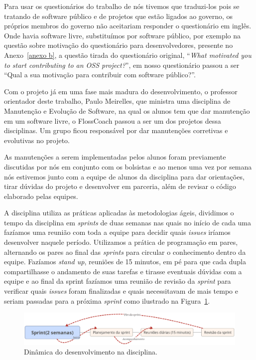 Para usar os questionários do trabalho de  nós tivemos que traduzi-los pois se tratando de
software público e de projetos que estão ligados ao governo, os próprios membros 
do governo não aceitariam responder o questionário em inglês. Onde havia software 
livre, substituímos por software público, por exemplo na questão sobre motivação
do questionário para desenvolvedores, presente no Anexo~\ref{anexo b}, a questão 
tirada do questionário original, ``\textit{What motivated you to start contributing 
to an OSS project?}'', em nosso questionário passou a ser ``Qual a sua motivação para 
contribuir com software público?''.

Com o projeto já em uma fase mais madura do desenvolvimento, o professor orientador
deste trabalho, Paulo Meirelles, que ministra uma disciplina de Manutenção e Evolução de
Software, na qual os alunos tem que dar manutenção em um software livre, o FlossCoach
passou a ser um dos projetos dessa disciplinas. Um grupo ficou responsável por dar 
manutenções corretivas e evolutivas no projeto.

As manutenções a serem implementadas pelos alunos foram previamente discutidas
por nós em conjunto com os bolsistas e ao menos uma vez por semana nós estivemos junto com a 
equipe de alunos da disciplina para dar orientações, tirar dúvidas do projeto
e desenvolver em parceria, além de revisar o código elaborado pelas equipes.
 
A disciplina utiliza as práticas aplicadas às metodologias ágeis, dividimos o tempo 
da disciplina em \textit{sprints} de duas semanas nas quais no início de cada uma 
fazíamos uma reunião com toda a equipe para decidir quais \textit{issues} iríamos 
desenvolver naquele período. Utilizamos a prática de programação em pares, alternando
os pares ao final das \textit{sprints} para circular o conhecimento dentro da equipe.
Fazíamos \textit{stand up}, reuniões de 15 minutos, em pé para que cada dupla compartilhasse
o andamento de suas tarefas e tirasse eventuais dúvidas com a equipe e ao final da sprint 
fazíamos uma reunião de revisão da \textit{sprint} para verificar quais \textit{issues} foram finalizadas e quais 
necessitavam de mais tempo e seriam passadas para a próxima \textit{sprint} como ilustrado na Figura~\ref{fig:disciplina}.

\begin{figure}[h]
	\centering
		\includegraphics[keepaspectratio=true,scale=0.4]{figuras/Sprint.eps}
	\caption{Dinâmica do desenvolvimento na disciplina.}
	\label{fig:disciplina}
\end{figure}

